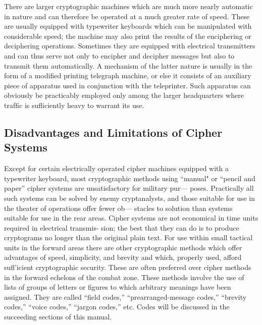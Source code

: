 \mypara There are larger cryptographic machines which are much more
nearly automatic in nature and can therefore be operated at a much
greater rate of speed. These are usually equipped with typewriter keyboards which can be manipulated with considerable speed; the machine
may also print the results of the enciphering or deciphering operations.
Sometimes they are equipped with electrical transmitters and can thus
serve not only to encipher and decipher messages but also to transmit
them automatically. A mechanism of the latter nature is usually in the
form of a modiﬁed printing telegraph machine, or else it consists of an
auxiliary piece of apparatus used in conjunction with the teleprinter.
Such apparatus can obviously be practicably employed only among the
larger headquarters where trafﬁc is suﬂiciently heavy to warrant its use.

\subsection{Disadvantages and Limitations of Cipher Systems}

Except for certain electrically operated cipher machines equipped with
a typewriter keyboard, most cryptographic methods using “manual"
or “pencil and paper” cipher systems are unsatisfactory for military pur—
poses. Practically all such systems can be solved by enemy cryptanalysts,
and those suitable for use in the theater of operations offer fewer ob—
stacles to solution than systems suitable for use in the rear areas. Cipher
systems are not economical in time units required in electrical transmis-
sion; the best that they can do is to produce cryptograms no longer than
the original plain text. For use within small tactical units in the forward
areas there are other cryptographic methods which offer advantages of
speed, simplicity, and brevity and which, properly used, afford suﬂ’icient
cryptographic security. These are often preferred over cipher methods in
the forward echelons of the combat zone. These methods involve the use
of lists of groups of letters or ﬁgures to which arbitrary meanings have
been assigned. They are called “ﬁeld codes,” “prearranged-message
codes,” “brevity codes,” “voice codes,” “jargon codes,” etc. Codes will
be discussed in the succeeding sections of this manual.
